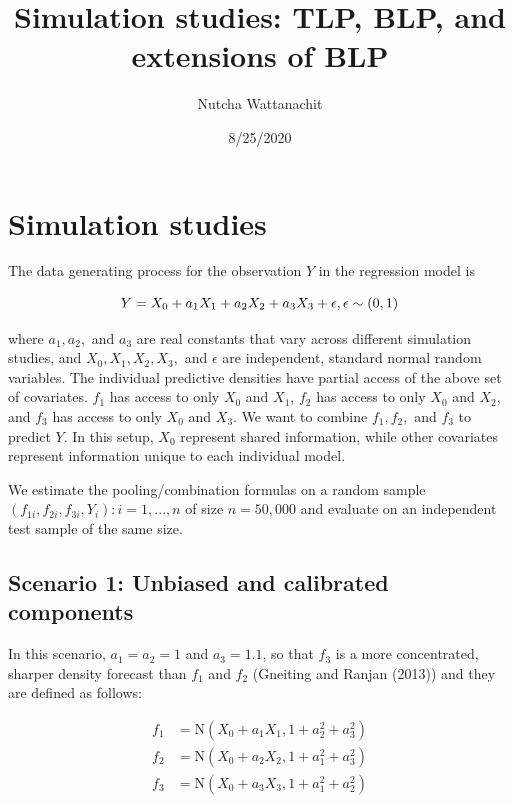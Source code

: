 \documentclass[]{article}
\title{Simulation studies: TLP, BLP, and extensions of BLP}
\author{Nutcha Wattanachit}
\date{8/25/2020}
\begin{document}
\maketitle

\hypertarget{simulation-studies}{%
\section{Simulation studies}\label{simulation-studies}}

The data generating process for the observation \(Y\) in the regression
model is

\[
Y = X_0+a_1X_1+a_2X_2+a_3X_3+ \epsilon, \\
\epsilon \sim(0,1)
\]

where \(a_1,a_2,\) and \(a_3\) are real constants that vary across
different simulation studies, and \(X_0,X_1,X_2,X_3,\) and \(\epsilon\)
are independent, standard normal random variables. The individual
predictive densities have partial access of the above set of covariates.
\(f_1\) has access to only \(X_0\) and \(X_1\), \(f_2\) has access to
only \(X_0\) and \(X_2\), and \(f_3\) has access to only \(X_0\) and
\(X_3\). We want to combine \(f_1,f_2,\) and \(f_3\) to predict \(Y\).
In this setup, \(X_0\) represent shared information, while other
covariates represent information unique to each individual model.

We estimate the pooling/combination formulas on a random sample
\({(f_{1i} , f_{2i} , f_{3i}, Y_i) : i = 1,..., n}\) of size
\(n = 50,000\) and evaluate on an independent test sample of the same
size.

\clearpage

\hypertarget{scenario-1-unbiased-and-calibrated-components}{%
\subsection{Scenario 1: Unbiased and calibrated
components}\label{scenario-1-unbiased-and-calibrated-components}}

In this scenario, \(a_1 = a_2 = 1\) and \(a_3 = 1.1\), so that \(f_3\)
is a more concentrated, sharper density forecast than \(f_1\) and
\(f_2\) (Gneiting and Ranjan (2013)) and they are defined as follows:

\[
\begin{aligned}
f_1&=\text{N}(X_0+a_1X_1,1+a^2_2+a^2_3)\\
f_2&=\text{N}(X_0+a_2X_2,1+a^2_1+a^2_3)\\
f_3&=\text{N}(X_0+a_3X_3,1+a^2_1+a^2_2)\\
\end{aligned}
\]
\end{document}
